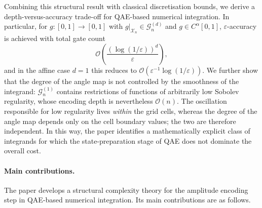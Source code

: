 \documentclass[12pt,a4paper]{article}
\theoremstyle{plain}
\theoremstyle{definition}
\theoremstyle{remark}
\begin{document}
Combining this structural result with classical discretisation bounds,
we derive a depth-versus-accuracy trade-off for QAE-based numerical
integration.
In particular, for $g:[0,1]\to[0,1]$ with $g|_{\mathcal{X}_n} \in
\mathcal{G}_n^{(d)}$ and $g \in C^\alpha[0,1]$,
$\varepsilon$-accuracy is achieved with total gate count
\[
\mathcal{O}\!\left(\frac{(\log(1/\varepsilon))^d}{\varepsilon}\right),
\]
and in the affine case $d=1$ this reduces to
$\mathcal{O}(\varepsilon^{-1}\log(1/\varepsilon))$.
We further show that the degree of the angle map is not controlled by
the smoothness of the integrand: $\mathcal{G}_n^{(1)}$ contains
restrictions of functions of arbitrarily low Sobolev regularity, whose
encoding depth is nevertheless $\mathcal{O}(n)$.
The oscillation responsible for low regularity lives \emph{within}
the grid cells, whereas the degree of the angle map depends only on the
cell boundary values; the two are therefore independent.
In this way, the paper identifies a mathematically explicit class of
integrands for which the state-preparation stage of QAE does not
dominate the overall cost.

\paragraph{Main contributions.}
The paper develops a structural complexity theory for the amplitude
encoding step in QAE-based numerical integration.
Its main contributions are as follows.
\end{document}
